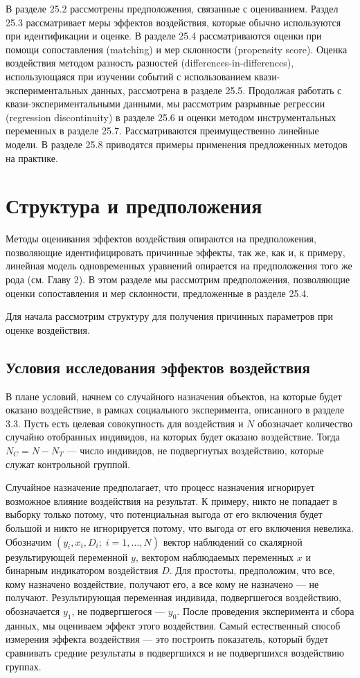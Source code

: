 В разделе 25.2 рассмотрены предположения, связанные с оцениванием. Раздел 25.3 рассматривает меры эффектов воздействия, которые обычно используются при идентификации и оценке. В разделе 25.4 рассматриваются оценки при помощи сопоставления (matching) и мер склонности (propensity score). Оценка воздействия методом разность разностей (differences-in-differences), использующаяся при изучении событий с использованием квази-экспериментальных данных, рассмотрена в разделе 25.5. Продолжая работать с квази-экспериментальными данными, мы рассмотрим разрывные регрессии (regression discontinuity) в разделе 25.6 и оценки методом инструментальных переменных в разделе 25.7. Рассматриваются преимущественно линейные модели. В разделе 25.8 приводятся примеры применения предложенных методов на практике. 

\section{Структура и предположения}

Методы оценивания эффектов воздействия опираются на предположения, позволяющие идентифицировать причинные эффекты, так же, как и, к примеру, линейная модель одновременных уравнений опирается на предположения того же рода (см. Главу 2). В этом разделе мы рассмотрим предположения, позволяющие оценки сопоставления и мер склонности, предложенные в разделе 25.4. 

Для начала рассмотрим структуру для получения причинных параметров при оценке воздействия. 

\subsection{Условия исследования эффектов воздействия}

В плане условий, начнем со случайного назначения объектов, на которые будет оказано воздействие, в рамках социального эксперимента, описанного в разделе 3.3. Пусть есть целевая совокупность для воздействия и $N$ обозначает количество случайно отобранных индивидов, на которых будет оказано воздействие. Тогда $N_C = N - N_T$ --- число индивидов, не подвергнутых воздействию, которые служат контрольной группой. 

Случайное назначение предполагает, что процесс назначения игнорирует возможное влияние воздействия на результат. К примеру, никто не попадает в выборку только потому, что потенциальная выгода от его включения будет большой и никто не игнорируется потому, что выгода от его включения невелика. Обозначим $(y_i, x_i, D_i; \; i = 1, \dots, N)$ вектор наблюдений со скалярной результирующей переменной $y$, вектором наблюдаемых переменных $x$ и бинарным индикатором воздействия $D$. Для простоты, предположим, что все, кому назначено воздействие, получают его, а все кому не назначено --- не получают. Результирующая переменная индивида, подвергшегося воздействию, обозначается $y_1$, не подвергшегося --- $y_0$. После проведения эксперимента и сбора данных, мы оцениваем эффект этого воздействия. Самый естественный способ измерения эффекта воздействия --- это построить показатель, который будет сравнивать средние результаты в подвергшихся и не подвергшихся воздействию группах. 

